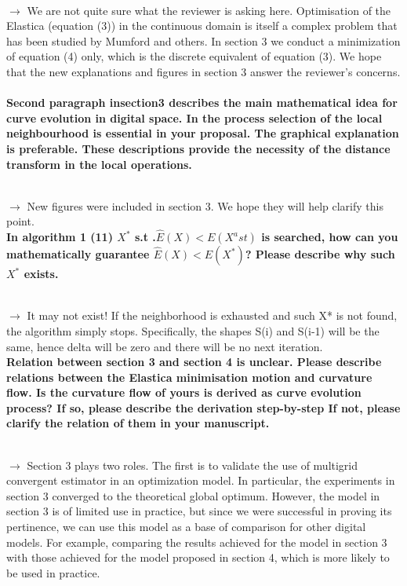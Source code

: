 \documentclass[12pt]{article}
\begin{document}
~\\
$\rightarrow$ We are not quite sure what the reviewer is asking here. Optimisation of the Elastica (equation (3)) in the
continuous domain is itself a complex problem that has been studied by Mumford and others. In section 3 we conduct a
minimization of equation (4) only, which is the discrete equivalent of equation (3). We hope that the new explanations
and figures in section 3 answer the reviewer's concerns.
~\\


\textbf{Second paragraph insection3 describes the main mathematical idea for curve evolution in digital space. In the process selection of the local neighbourhood is essential in your proposal. The graphical explanation is preferable. These descriptions provide the necessity of the distance transform in the local operations.}

~\\
$\rightarrow$ New figures were included in section 3. We hope they will help clarify this point.
~\\


\textbf{In algorithm 1 (11) $X^\ast$ s.t .$\hat{E}(X)< E(X^ast)$ is searched, how can you mathematically guarantee $\hat{E}(X)< E(X^\ast)$? Please describe why such $X^{\ast}$ exists.}

~\\
$\rightarrow$ It may not exist! If the neighborhood is exhausted and such X* is not found, the algorithm simply stops. Specifically, the shapes S(i) and S(i-1) will be the same, hence delta will be zero and there will be no next iteration.
~\\


\textbf{Relation between section 3 and section 4 is unclear.
Please describe relations between the Elastica minimisation motion and curvature flow.
Is the curvature flow of yours is derived as curve evolution process?
If so, please describe the derivation step-by-step
If not, please clarify the relation of them in your manuscript.}

~\\
$\rightarrow$ Section 3 plays two roles. The first is to validate the use of multigrid convergent estimator in an optimization model. In particular, the experiments in section 3 converged to the theoretical global optimum. However, the model in section 3 is of limited use in practice, but since we were successful in proving its pertinence, we can use this model as a base of comparison for other digital models. For example, comparing the results achieved for the model in section 3 with those achieved for the model proposed in section 4, which is more likely to be used in practice.
~\\




\end{document}
